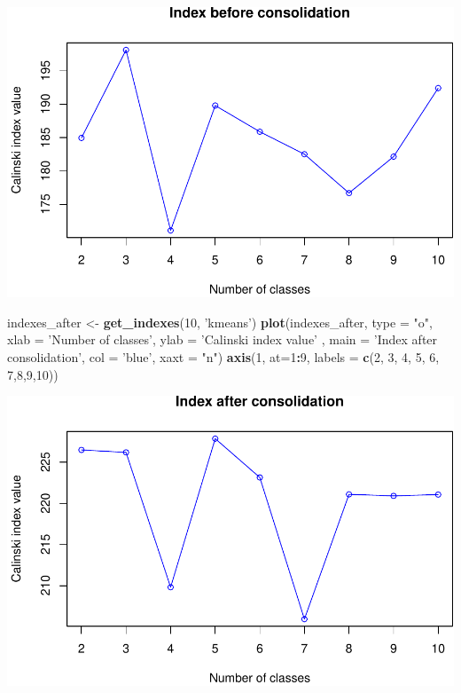 \documentclass[]{article}
\newenvironment{Shaded}{\begin{snugshade}}{\end{snugshade}}
\newcommand{\KeywordTok}[1]{\textcolor[rgb]{0.13,0.29,0.53}{\textbf{#1}}}
\newcommand{\DataTypeTok}[1]{\textcolor[rgb]{0.13,0.29,0.53}{#1}}
\newcommand{\DecValTok}[1]{\textcolor[rgb]{0.00,0.00,0.81}{#1}}
\newcommand{\StringTok}[1]{\textcolor[rgb]{0.31,0.60,0.02}{#1}}
\newcommand{\OperatorTok}[1]{\textcolor[rgb]{0.81,0.36,0.00}{\textbf{#1}}}
\newcommand{\NormalTok}[1]{#1}
\begin{document}
\includegraphics{project_report_files/figure-latex/unnamed-chunk-16-1.pdf}

\begin{Shaded}
\begin{Highlighting}[]
\NormalTok{indexes_after <-}\StringTok{ }\KeywordTok{get_indexes}\NormalTok{(}\DecValTok{10}\NormalTok{, }\StringTok{'kmeans'}\NormalTok{)}
\KeywordTok{plot}\NormalTok{(indexes_after, }\DataTypeTok{type =} \StringTok{"o"}\NormalTok{, }\DataTypeTok{xlab =} \StringTok{'Number of classes'}\NormalTok{, }\DataTypeTok{ylab =} \StringTok{'Calinski index value'}
\NormalTok{, }\DataTypeTok{main =} \StringTok{'Index after consolidation'}\NormalTok{, }\DataTypeTok{col =} \StringTok{'blue'}\NormalTok{, xaxt}
\NormalTok{=}\StringTok{ "n"}\NormalTok{)}
\KeywordTok{axis}\NormalTok{(}\DecValTok{1}\NormalTok{, }\DataTypeTok{at=}\DecValTok{1}\OperatorTok{:}\DecValTok{9}\NormalTok{, }\DataTypeTok{labels =} \KeywordTok{c}\NormalTok{(}\DecValTok{2}\NormalTok{, }\DecValTok{3}\NormalTok{, }\DecValTok{4}\NormalTok{, }\DecValTok{5}\NormalTok{, }\DecValTok{6}\NormalTok{, }\DecValTok{7}\NormalTok{,}\DecValTok{8}\NormalTok{,}\DecValTok{9}\NormalTok{,}\DecValTok{10}\NormalTok{))  }
\end{Highlighting}
\end{Shaded}

\includegraphics{project_report_files/figure-latex/unnamed-chunk-17-1.pdf}
\end{document}
